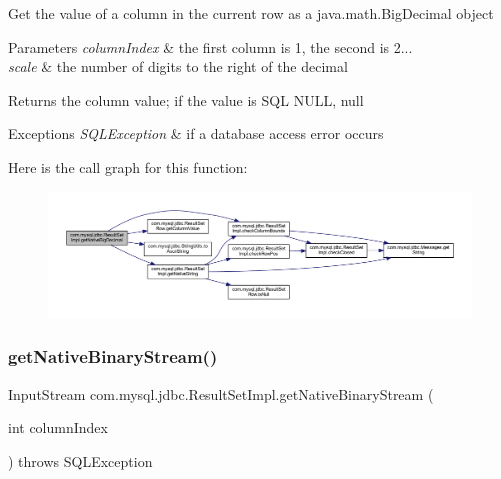 Get the value of a column in the current row as a java.\+math.\+Big\+Decimal object


\begin{DoxyParams}{Parameters}
{\em column\+Index} & the first column is 1, the second is 2... \\
\hline
{\em scale} & the number of digits to the right of the decimal\\
\hline
\end{DoxyParams}
\begin{DoxyReturn}{Returns}
the column value; if the value is S\+QL N\+U\+LL, null
\end{DoxyReturn}

\begin{DoxyExceptions}{Exceptions}
{\em S\+Q\+L\+Exception} & if a database access error occurs \\
\hline
\end{DoxyExceptions}
Here is the call graph for this function\+:
\nopagebreak
\begin{figure}[H]
\begin{center}
\leavevmode
\includegraphics[width=350pt]{classcom_1_1mysql_1_1jdbc_1_1_result_set_impl_a0a7e2392923b5db5870c053d91d42b29_cgraph}
\end{center}
\end{figure}
\mbox{\label{classcom_1_1mysql_1_1jdbc_1_1_result_set_impl_adc7bde8fcf56a85896f2d2320ae400be}} 
\subsubsection{\texorpdfstring{get\+Native\+Binary\+Stream()}{getNativeBinaryStream()}}
{\footnotesize\ttfamily Input\+Stream com.\+mysql.\+jdbc.\+Result\+Set\+Impl.\+get\+Native\+Binary\+Stream (\begin{DoxyParamCaption}\item[{int}]{column\+Index }\end{DoxyParamCaption}) throws S\+Q\+L\+Exception\hspace{0.3cm}{\ttfamily [protected]}}

